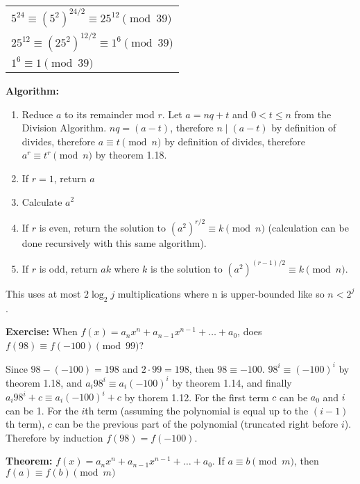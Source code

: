 \begin{tabular}[t]{l}
$ 5^{24} \equiv (5^2)^{24/2} \equiv 25^{12} \pmod{39} $ \\
$ 25^{12} \equiv (25^2)^{12/2} \equiv 1^{6} \pmod{39} $ \\
$ 1^{6} \equiv 1 \pmod{39} $ \\
\end{tabular}

\item \textbf{Algorithm:}

\begin{enumerate}
\item Reduce \(a\) to its remainder mod \(r\). Let \(a = nq + t\) and \(0 < t \leq n\) from the Division Algorithm. \(nq = (a - t)\), therefore \(n \mid (a-t)\) by definition of divides, therefore \(a \equiv t \pmod{n}\) by definition of divides, therefore \(a^r \equiv t^r \pmod{n}\) by theorem 1.18.
\item If \(r = 1\), return \(a\)
\item Calculate \(a^2\)
\item If \(r\) is even, return the solution to \((a^2)^{r/2} \equiv k \pmod{n}\) (calculation can be done recursively with this same algorithm).
\item If \(r\) is odd, return \(ak\) where \(k\) is the solution to \((a^2)^{(r-1)/2} \equiv k \pmod{n}\).
\end{enumerate}

This uses at most \(2 \log_2 j\) multiplications where n is upper-bounded like so \(n < 2^j\).

\item \textbf{Exercise:} When \(f(x) = a_n x^n + a_{n-1} x^{n-1} + \dots + a_0\), does \(f(98) \equiv f(-100) \pmod {99}\)?

Since \(98 - (-100) = 198\) and \(2 \cdot 99 = 198\), then \(98 \equiv -100\). \(98^i \equiv (-100)^i\) by theorem 1.18, and \(a_i 98^i \equiv a_i (-100)^i\) by theorem 1.14, and finally \(a_i 98^i + c \equiv a_i (-100)^i + c\) by thorem 1.12. For the first term \(c\) can be \(a_0\) and \(i\) can be 1. For the \(i\)th term (assuming the polynomial is equal up to the \((i-1)\)th term), \(c\) can be the previous part of the polynomial (truncated right before \(i\)). Therefore by induction \(f(98) = f(-100)\).

\item \textbf{Theorem:} \(f(x) = a_n x^n + a_{n-1} x^{n-1} + \dots + a_0\). If \(a \equiv b \pmod m\), then \(f(a) \equiv f(b) \pmod m\)

